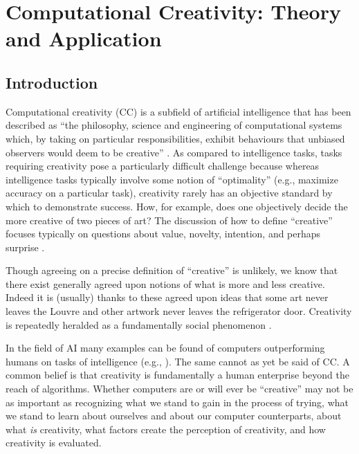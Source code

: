 \documentclass[phd,electronic,oneside,twosidetoc,letterpaper,chaptercenter,parttop,lof,lot]{byumsphd}
\begin{document}
\chapter{Computational Creativity: Theory and Application}

\section{Introduction}

Computational creativity (CC) is a subfield of artificial intelligence that has been described as ``the philosophy, science and engineering of computational systems which, by taking on particular responsibilities, exhibit behaviours that unbiased observers would deem to be creative'' \citep{colton2012computational}. As compared to intelligence tasks, tasks requiring creativity pose a particularly difficult challenge because whereas intelligence tasks typically involve some notion of ``optimality'' (e.g., maximize accuracy on a particular task), creativity rarely has an objective standard by which to demonstrate success. How, for example, does one objectively decide the more creative of two pieces of art? The discussion of how to define ``creative'' focuses typically on questions about value, novelty, intention, and perhaps surprise \citep{Boden2003TheEdition}. 

Though agreeing on a precise definition of ``creative'' is unlikely, we know that there exist generally agreed upon notions of what is more and less creative. Indeed it is (usually) thanks to these agreed upon ideas that some art never leaves the Louvre and other artwork never leaves the refrigerator door. Creativity is repeatedly heralded as a fundamentally social phenomenon \citep{csikszentmihalyi1997flow}.

In the field of AI many examples can be found of computers outperforming humans on tasks of intelligence (e.g., \cite{silver2016mastering}). The same cannot as yet be said of CC. A common belief is that creativity is fundamentally a human enterprise beyond the reach of algorithms. Whether computers are or will ever be ``creative'' may not be as important as recognizing what we stand to gain in the process of trying, what we stand to learn about ourselves and about our computer counterparts, about what \textit{is} creativity, what factors create the perception of creativity, and how creativity is evaluated.
\end{document}
